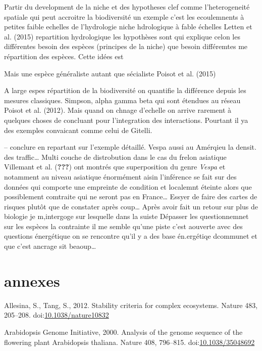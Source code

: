 Partir du development de la niche et des hypotheses clef comme
l'heterogeneité spatiale qui peut accroitre la biodiversité un exemple
c'est les ecoulemnents à petites faible echelles de l'hydrologie niche
hdrologique à fable échelles Letten et al. (2015) repartition
hydrologique les hypothèses sont qui explique celon les différentes
besoin des espèces (principes de la niche) que besoin différemtes me
répartition des espèces. Cette idées est

Mais une espèce généraliste autant que sécialiste Poisot et al. (2015)

A large espes répartition de la biodiversité on quantifie la différence
depuis les mesures classiques. Simpson, alpha gamma beta qui sont
étendues au réseau Poisot et al. (2012). Mais quand on chnage d'echelle
on arrive rarement à quelques choses de concluant pour l'integration des
interactions. Pourtant il ya des exemples convaicant comme celui de
Gitelli.

-- conclure en repartant sur l'exemple détaillé. Vespa aussi au Amérqieu
la densit. des traffic\ldots{} Multi couche de distrobution dans le cas
du frelon asiatique Villemant et al. ({\textbf{???}}) ont montrés que
superposition du genre \emph{Vespa} et notamment au niveau asiatique
énormément aisin l'inférence se fait sur des données qui comporte une
empreinte de condition et localemnt éteinte alors que possiblement
comtraite qui ne seront pas en France\ldots{} Essyer de faire des cartes
de risques plutôt que de constater après coup\ldots{} Après avoir fait
un retour sur plus de biologie je m,intergoge sur lesquelle dans la
suiste Dépasser les questionnemnet sur les espèces la contrainte il me
semble qu'une piste c'est aouverte avec des questions énergétique on se
rencontre qu'il y a des base én.ergétiqe dcommunet et que c'est ancrage
sit beaoup\ldots{}

\section*{annexes}\label{annexes}

\hypertarget{refs}{}
\hypertarget{ref-Allesina2012a}{}
Allesina, S., Tang, S., 2012. Stability criteria for complex ecosystems.
Nature 483, 205--208.
doi:\href{https://doi.org/10.1038/nature10832}{10.1038/nature10832}

\hypertarget{ref-TheArabidopsisGenomeInitiative2000}{}
Arabidopsis Genome Initiative, 2000. Analysis of the genome sequence of
the flowering plant Arabidopsis thaliana. Nature 408, 796--815.
doi:\href{https://doi.org/10.1038/35048692}{10.1038/35048692}

